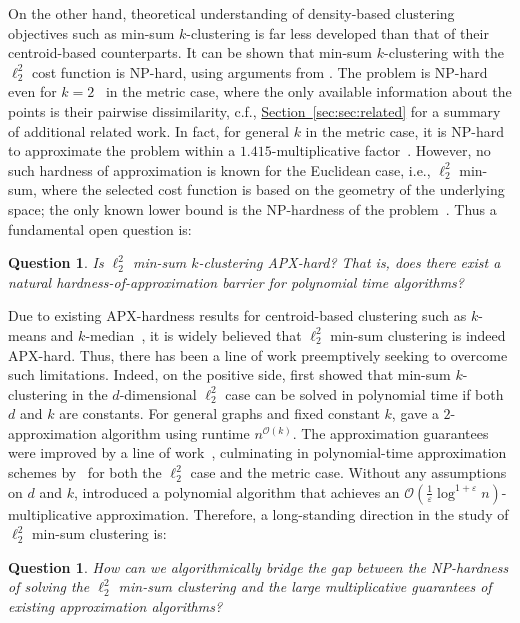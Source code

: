 \documentclass[11pt]{article}
\newcommand{\namedref}[2]{\hyperref[#2]{#1~\ref*{#2}}}
\newcommand{\secref}[1]{\namedref{Section}{sec:#1}}
\newcommand{\questlab}[1]{\label{quest:#1}}
\newtheorem{question}[theorem]{Question}
\renewcommand{\O}[1]{\ensuremath{\mathcal{O}\left(#1\right)}}
\newcommand{\eps}{\varepsilon}
\begin{document}
On the other hand, theoretical understanding of density-based clustering objectives such as min-sum $k$-clustering is far less developed than that of their centroid-based counterparts. 
It can be shown that min-sum $k$-clustering with the $\ell_2^2$ cost function is NP-hard, using arguments from \cite{AloiseDHP09}. 
The problem is NP-hard even for $k=2$~\cite{VegaK01} in the metric case, where the only available information about the points is their pairwise dissimilarity, c.f., \secref{sec:related} for a summary of additional related work.  
In fact, for general $k$ in the metric case, it is NP-hard to approximate the problem within a $1.415$-multiplicative factor~\cite{GuruswamiI03,Cohen-AddadSL21}. 
However, no such hardness of approximation is known for the Euclidean case, i.e., $\ell_2^2$ min-sum, where the selected cost function is based on the geometry of the underlying space; the only known lower bound is the NP-hardness of the problem~\cite{AloiseDHP09,BanerjeeOR21,AKP24}. 
Thus a fundamental open question is:
\begin{question}
\questlab{quest:apx}
Is $\ell_2^2$ min-sum $k$-clustering APX-hard? 
That is, does there exist a natural hardness-of-approximation barrier for polynomial time algorithms?
\end{question}
Due to existing APX-hardness results for centroid-based clustering such as $k$-means and $k$-median~\cite{LeeSW17,Cohen-AddadS19,Cohen-AddadSL22}, it is widely believed that $\ell_2^2$ min-sum clustering is indeed APX-hard. 
Thus, there has been a line of work preemptively seeking to overcome such limitations. 
Indeed, on the positive side, \cite{InabaKI94} first showed that min-sum $k$-clustering in the $d$-dimensional $\ell_2^2$ case can be solved in polynomial time if both $d$ and $k$ are constants. 
For general graphs and fixed constant $k$, \cite{Guttmann-BeckH98a} gave a $2$-approximation algorithm using runtime $n^{\O{k}}$. 
The approximation guarantees were improved by a line of work~\cite{Indyk99,Matousek00,Schulman00}, culminating in polynomial-time approximation schemes by~\cite{VegaKKR03} for both the $\ell_2^2$ case and the metric case. 
Without any assumptions on $d$ and $k$, \cite{BartalCR01} introduced a polynomial algorithm that achieves an $\O{\frac{1}{\eps}\log^{1+\eps}n}$-multiplicative approximation. 
Therefore, a long-standing direction in the study of $\ell_2^2$ min-sum clustering is:
\begin{question}
\questlab{quest:algs}
How can we algorithmically bridge the gap between the NP-hardness of solving the $\ell_2^2$ min-sum clustering and the large multiplicative guarantees of existing approximation algorithms?
\end{question}
\end{document}
